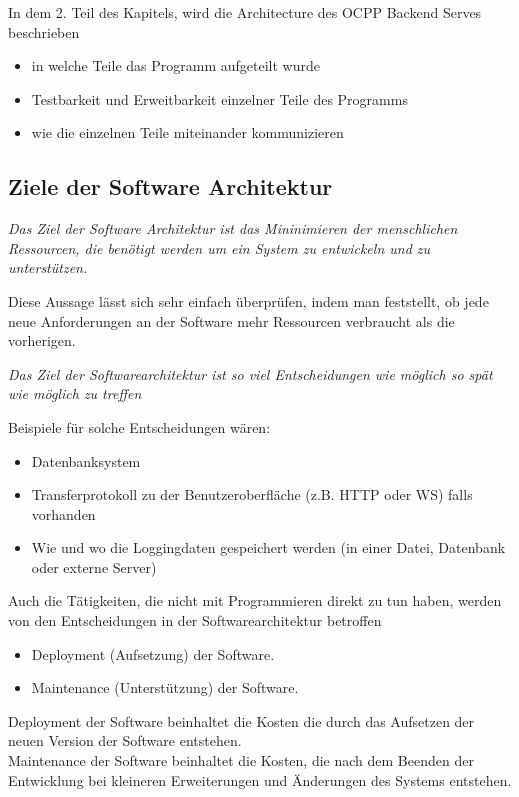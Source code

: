 \documentclass{article}
\begin{document}
    In dem 2. Teil des Kapitels, wird die Architecture des OCPP Backend Serves beschrieben
    \begin{itemize}
        \item in welche Teile das Programm aufgeteilt wurde
        \item Testbarkeit und Erweitbarkeit einzelner Teile des Programms
        \item wie die einzelnen Teile miteinander kommunizieren
    \end{itemize}

    \subsection{Ziele der Software Architektur}

    \textit{Das Ziel der Software Architektur ist das Mininimieren der menschlichen Ressourcen, 
    die benötigt werden um ein System zu entwickeln und zu unterstützen.}\cite[5]{cleanArchitecture}

    Diese Aussage lässt sich sehr einfach überprüfen, indem man feststellt, 
    ob jede neue Anforderungen an der Software mehr Ressourcen verbraucht als die vorherigen.

    \textit{Das Ziel der Softwarearchitektur ist so viel Entscheidungen wie möglich so spät wie möglich zu treffen}
    \cite[136]{cleanArchitecture}

    Beispiele für solche Entscheidungen wären:
    \begin{itemize}
        \item Datenbanksystem
        \item Transferprotokoll zu der Benutzeroberfläche (z.B. HTTP oder WS) falls vorhanden
        \item Wie und wo die Loggingdaten gespeichert werden (in einer Datei, Datenbank oder externe Server)
    \end{itemize}

    Auch die Tätigkeiten, die nicht mit Programmieren direkt zu tun haben, werden von den Entscheidungen in der Softwarearchitektur betroffen
    \begin{itemize}
        \item Deployment (Aufsetzung) der Software.
        \item Maintenance (Unterstützung) der Software.
    \end{itemize}

    Deployment der Software beinhaltet die Kosten die durch das Aufsetzen der neuen Version der Software entstehen.\\
    Maintenance der Software beinhaltet die Kosten, die nach dem Beenden der Entwicklung bei kleineren Erweiterungen und Änderungen des Systems entstehen.
\end{document}
